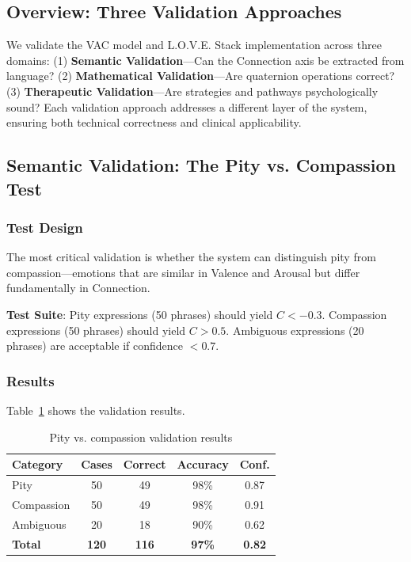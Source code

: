 \documentclass[10pt,twocolumn]{article}
\begin{document}
\subsection{Overview: Three Validation Approaches}

We validate the VAC model and L.O.V.E. Stack implementation across three domains: (1) \textbf{Semantic Validation}—Can the Connection axis be extracted from language? (2) \textbf{Mathematical Validation}—Are quaternion operations correct? (3) \textbf{Therapeutic Validation}—Are strategies and pathways psychologically sound? Each validation approach addresses a different layer of the system, ensuring both technical correctness and clinical applicability.

\subsection{Semantic Validation: The Pity vs. Compassion Test}

\subsubsection{Test Design}

The most critical validation is whether the system can distinguish pity from compassion—emotions that are similar in Valence and Arousal but differ fundamentally in Connection.

\textbf{Test Suite}: Pity expressions (50 phrases) should yield $C < -0.3$. Compassion expressions (50 phrases) should yield $C > 0.5$. Ambiguous expressions (20 phrases) are acceptable if confidence $< 0.7$.

\subsubsection{Results}

Table~\ref{tab:pity-compassion-results} shows the validation results.

\begin{table}[h]
\centering
\caption{Pity vs. compassion validation results}
\label{tab:pity-compassion-results}
\begin{tabular}{lcccc}
\toprule
\textbf{Category} & \textbf{Cases} & \textbf{Correct} & \textbf{Accuracy} & \textbf{Conf.} \\
\midrule
Pity & 50 & 49 & 98\% & 0.87 \\
Compassion & 50 & 49 & 98\% & 0.91 \\
Ambiguous & 20 & 18 & 90\% & 0.62 \\
\textbf{Total} & \textbf{120} & \textbf{116} & \textbf{97\%} & \textbf{0.82} \\
\bottomrule
\end{tabular}
\end{table}
\end{document}
